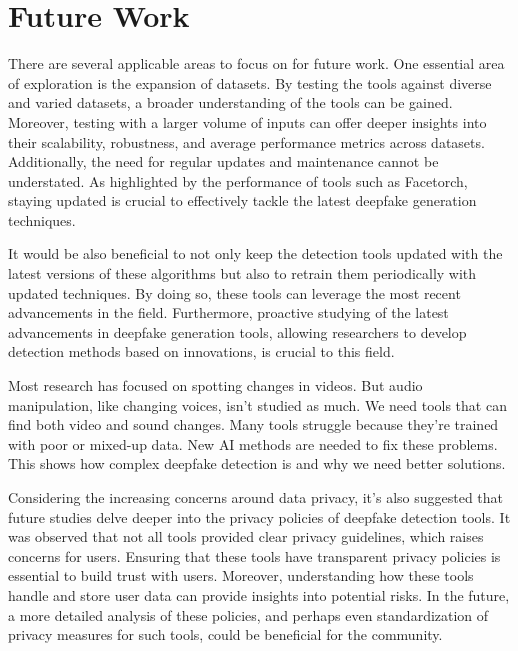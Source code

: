 \section{Future Work}
There are several applicable areas to focus on for future work. One essential area of
exploration is the expansion of datasets. By testing the tools against diverse and varied
datasets, a broader understanding of the tools can be gained. Moreover, testing with a
larger volume of inputs can offer deeper insights into their scalability, robustness,
and average performance metrics across datasets. Additionally, the need for regular
updates and maintenance cannot be understated. As highlighted by the performance of
tools such as Facetorch, staying updated is crucial to effectively tackle the latest
deepfake generation techniques.

It would be also beneficial to not only keep the
detection tools updated with the latest versions of these algorithms but also to
retrain them periodically with updated techniques. By doing so, these tools can
leverage the most recent advancements in the field. Furthermore, proactive studying of the
latest advancements in deepfake generation tools, allowing researchers to develop detection
methods based on innovations, is crucial to this field.

Most research has focused on spotting changes in videos. But audio manipulation,
like changing voices, isn't studied as much. We need tools that can find both video
and sound changes. Many tools struggle because they're trained with poor or mixed-up
data. New \ac{AI} methods are needed to fix these problems. This shows how complex
deepfake detection is and why we need better solutions.

Considering the increasing concerns around data privacy, it's also suggested that future
studies delve deeper into the privacy policies of deepfake detection tools. It was
observed that not all tools provided clear privacy guidelines, which raises concerns
for users. Ensuring that these tools have transparent privacy policies is essential to
build trust with users. Moreover, understanding how these tools handle and store
user data can provide insights into potential risks. In the future, a more detailed
analysis of these policies, and perhaps even standardization of privacy measures
for such tools, could be beneficial for the community.

